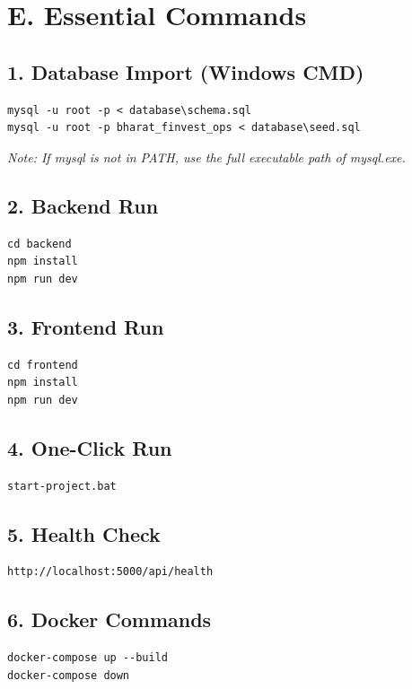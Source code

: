 \section{E. Essential Commands}
\subsection*{1. Database Import (Windows CMD)}
\begin{verbatim}
mysql -u root -p < database\schema.sql
mysql -u root -p bharat_finvest_ops < database\seed.sql
\end{verbatim}
\textit{Note: If mysql is not in PATH, use the full executable path of mysql.exe.}

\subsection*{2. Backend Run}
\begin{verbatim}
cd backend
npm install
npm run dev
\end{verbatim}

\subsection*{3. Frontend Run}
\begin{verbatim}
cd frontend
npm install
npm run dev
\end{verbatim}

\subsection*{4. One-Click Run}
\begin{verbatim}
start-project.bat
\end{verbatim}

\subsection*{5. Health Check}
\begin{verbatim}
http://localhost:5000/api/health
\end{verbatim}

\subsection*{6. Docker Commands}
\begin{verbatim}
docker-compose up --build
docker-compose down
\end{verbatim}

